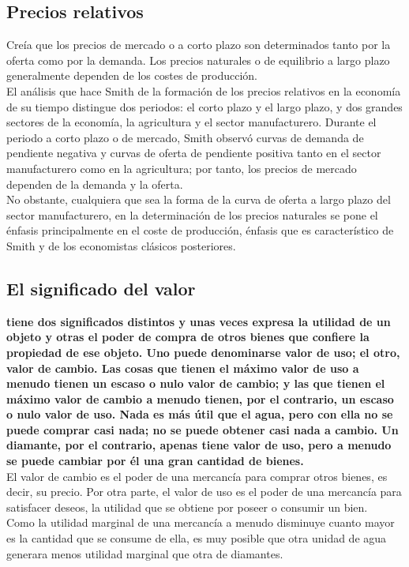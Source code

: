 \documentclass[10pt]{book}
\begin{document}
\subsection*{Precios relativos}
Creía que los precios de mercado o a corto plazo son determinados tanto por la
oferta como por la demanda. Los precios naturales o de equilibrio a largo plazo generalmente dependen de los costes de producción.\\
El análisis que hace Smith de la formación de los precios relativos en la economía de su tiempo distingue dos periodos: el corto plazo y el largo plazo, y dos grandes sectores de la economía, la agricultura y el sector manufacturero. Durante el periodo a corto plazo o de mercado, Smith observó curvas de demanda de pendiente negativa y curvas de oferta de pendiente positiva tanto en el sector manufacturero como en la agricultura; por tanto, los precios de mercado dependen de la demanda y la oferta.\\
No obstante, cualquiera que sea la forma de la curva de oferta a largo plazo del sector manufacturero, en la determinación de los precios naturales se pone el énfasis principalmente en el coste de producción, énfasis que es característico de Smith y de los economistas clásicos posteriores.\\

\subsection*{El significado del valor}
\textbf{tiene dos significados distintos y unas veces expresa la utilidad de un objeto y otras el poder de compra de otros bienes que confiere la propiedad de ese objeto. Uno puede denominarse valor de uso; el otro, valor de cambio. Las cosas que tienen el máximo valor de uso a menudo tienen un escaso o nulo valor de cambio; y las que tienen el máximo valor de cambio a menudo tienen, por el contrario, un escaso o nulo valor de uso. Nada es más útil que el agua, pero con ella no se puede comprar casi nada; no se puede obtener casi nada a cambio. Un diamante, por el contrario, apenas tiene valor de uso, pero a menudo se puede cambiar por él una gran cantidad de bienes.}\\
El valor de cambio es el poder de una mercancía para comprar otros bienes, es decir, su precio. Por otra parte, el valor de uso es el poder de una mercancía para satisfacer deseos, la utilidad que se obtiene por poseer o consumir un bien.\\
Como la utilidad marginal de una mercancía a menudo disminuye cuanto mayor es la cantidad que se consume de ella, es muy posible que otra unidad de agua generara menos utilidad marginal que otra de diamantes.\\
\end{document}
